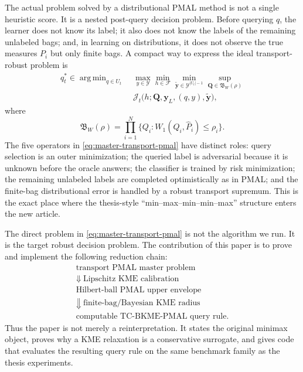 \documentclass[10pt,journal]{IEEEtran}
\DeclareMathOperator*{\argmin}{arg\,min}
\newcommand{\Ycal}{\mathcal{Y}}
\newcommand{\Jcal}{\mathcal{J}}
\newcommand{\Fcal}{\mathcal{F}}
\newcommand{\wh}{\widehat}
\begin{document}
The actual problem solved by a distributional PMAL method is not a single heuristic score. It is a nested post-query decision problem. Before querying $q$, the learner does not know its label; it also does not know the labels of the remaining unlabeled bags; and, in learning on distributions, it does not observe the true measures $P_i$ but only finite bags. A compact way to express the ideal transport-robust problem is
\begin{equation}
\label{eq:master-transport-pmal}
\begin{aligned}
q_t^* \in \argmin_{q\in U_t}\;&
\max_{y\in\Ycal}
\min_{h\in\Fcal}
\min_{\tilde{\mathbf y}\in\Ycal^{|U_t|-1}}
\sup_{\mathbf Q\in\mathfrak{B}_W(\rho)} \\
&\Jcal_t\big(h;\mathbf Q,\mathbf y_L,(q,y),\tilde{\mathbf y}\big),
\end{aligned}
\end{equation}
where
\begin{equation}
\label{eq:transport-product-ball}
\mathfrak{B}_W(\rho)=
\prod_{i=1}^{N}\{Q_i:W_1(Q_i,\wh P_i)\le \rho_i\}.
\end{equation}
The five operators in \eqref{eq:master-transport-pmal} have distinct roles: query selection is an outer minimization; the queried label is adversarial because it is unknown before the oracle answers; the classifier is trained by risk minimization; the remaining unlabeled labels are completed optimistically as in PMAL; and the finite-bag distributional error is handled by a robust transport supremum. This is the exact place where the thesis-style ``min--max--min--min--max'' structure enters the new article.

The direct problem in \eqref{eq:master-transport-pmal} is not the algorithm we run. It is the target robust decision problem. The contribution of this paper is to prove and implement the following reduction chain:
\begin{equation}
\label{eq:reduction-chain}
\begin{array}{c}
\text{transport PMAL master problem}\\[0.2em]
\Downarrow\ \text{Lipschitz KME calibration}\\[0.2em]
\text{Hilbert-ball PMAL upper envelope}\\[0.2em]
\Downarrow\ \text{finite-bag/Bayesian KME radius}\\[0.2em]
\text{computable TC-BKME-PMAL query rule.}
\end{array}
\end{equation}
Thus the paper is not merely a reinterpretation. It states the original minimax object, proves why a KME relaxation is a conservative surrogate, and gives code that evaluates the resulting query rule on the same benchmark family as the thesis experiments.
\end{document}
